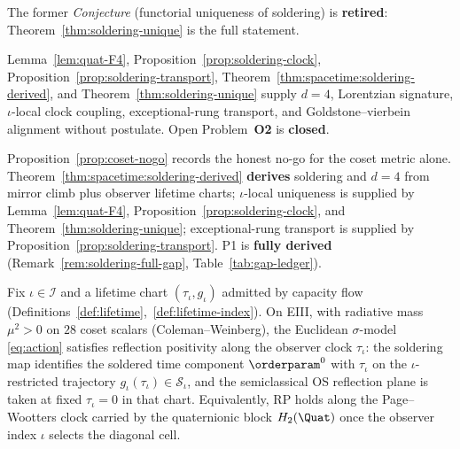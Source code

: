 \begin{corollary}
\label{conj:soldering-unique}
The former \emph{Conjecture} (functorial uniqueness of soldering) is
\textbf{retired}: Theorem~\ref{thm:soldering-unique} is the full statement.
\end{corollary}

\begin{remark}
\label{rem:soldering-full-gap}
Lemma~\ref{lem:quat-F4}, Proposition~\ref{prop:soldering-clock},
Proposition~\ref{prop:soldering-transport},
Theorem~\ref{thm:spacetime:soldering-derived}, and
Theorem~\ref{thm:soldering-unique} supply $d=4$, Lorentzian signature,
$\iota$-local clock coupling, exceptional-rung transport, and
Goldstone--vierbein alignment without postulate. Open Problem~\textbf{O2} is
\textbf{closed}.
\end{remark}

\begin{remark}
Proposition~\ref{prop:coset-nogo} records the honest no-go for the coset
metric alone. Theorem~\ref{thm:spacetime:soldering-derived} \textbf{derives}
soldering and $d=4$ from mirror climb plus observer lifetime charts;
$\iota$-local uniqueness is supplied by Lemma~\ref{lem:quat-F4},
Proposition~\ref{prop:soldering-clock}, and
Theorem~\ref{thm:soldering-unique}; exceptional-rung transport is supplied
by Proposition~\ref{prop:soldering-transport}. P1 is \textbf{fully derived}
(Remark~\ref{rem:soldering-full-gap}, Table~\ref{tab:gap-ledger}).
\end{remark}

\begin{theorem}
\label{thm:rp}
Fix $\iota\in\mathcal{I}$ and a lifetime chart
$(\tau_\iota,g_\iota)$ admitted by capacity flow
(Definitions~\ref{def:lifetime},~\ref{def:lifetime-index}). On EIII, with
radiative mass $\mu^2>0$ on $28$ coset scalars (Coleman--Weinberg), the
Euclidean $\sigma$-model \eqref{eq:action} satisfies reflection positivity
along the observer clock $\tau_\iota$: the soldering map identifies the
soldered time component $\orderparam^0$ with $\tau_\iota$ on the
$\iota$-restricted trajectory $g_\iota(\tau_\iota)\in\mathcal{S}_\iota$, and
the semiclassical OS reflection plane is taken at fixed $\tau_\iota=0$ in
that chart. Equivalently, RP holds along the Page--Wootters clock carried by
the quaternionic block $H_2(\Quat)$ once the observer index $\iota$ selects
the diagonal cell.
\end{theorem}

